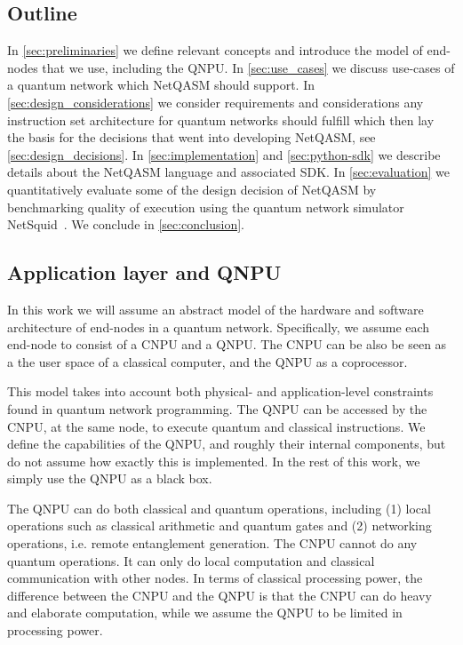 \subsection{Outline}
In \cref{sec:preliminaries} we define relevant concepts and introduce the model of end-nodes that we use, including the \ac{QNPU}.
In \cref{sec:use_cases} we discuss use-cases of a quantum network which \ac{NetQASM} should support.
In \cref{sec:design_considerations} we consider requirements and considerations any instruction set architecture for quantum networks should fulfill which then lay the basis for the decisions that went into developing \ac{NetQASM}, see \cref{sec:design_decisions}.
In \cref{sec:implementation} and \cref{sec:python-sdk} we describe details about the \ac{NetQASM} language and associated SDK.
In \cref{sec:evaluation} we quantitatively evaluate some of the design decision of \ac{NetQASM} by benchmarking quality of execution using the quantum network simulator NetSquid~\cite{netsquid,coopmans2021netsquid}.
We conclude in \cref{sec:conclusion}.







\subsection{Application layer and QNPU}
\label{sec:abstract_model}

In this work we will assume an abstract model of the hardware and software architecture of end-nodes in a quantum network.
Specifically, we assume each end-node to consist of a \acf{CNPU} and a \acf{QNPU}.
The \ac{CNPU} can be also be seen as a the user space of a classical computer, and the \ac{QNPU} as a coprocessor.

This model takes into account both physical- and application-level constraints found in quantum network programming.
The \ac{QNPU} can be accessed by the \ac{CNPU}, at the same node, to execute quantum and classical instructions.
We define the capabilities of the \ac{QNPU}, and roughly their internal components, but do not assume how exactly this is implemented.
In the rest of this work, we simply use the \ac{QNPU} as a black box.

The \ac{QNPU} can do both classical and quantum operations, including
    (1) local operations such as classical arithmetic and quantum gates and
    (2) networking operations, i.e. remote entanglement generation.
The \ac{CNPU} cannot do any quantum operations.
It can only do local computation and classical communication with other nodes.
In terms of classical processing power, the difference between the \ac{CNPU} and the \ac{QNPU} is that the \ac{CNPU} can do heavy and elaborate computation, while we assume the \ac{QNPU} to be limited in processing power.


